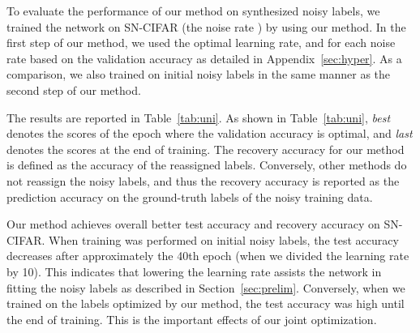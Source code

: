 \documentclass[10pt,twocolumn,letterpaper]{article}
\newcommand{\Tref}[1]{Table~\ref{#1}}
\newcommand{\Sref}[1]{Section~\ref{#1}}
\newcommand{\APref}[1]{Appendix~\ref{#1}}
\begin{document}
To evaluate the performance of our method on synthesized noisy labels, we trained the network on SN-CIFAR (the noise rate ) by using our method.
In the first step of our method, we used the optimal learning rate,  and  for each noise rate based on the validation accuracy as detailed in \APref{sec:hyper}.
As a comparison, we also trained on initial noisy labels in the same manner as the second step of our method.

The results are reported in \Tref{tab:uni}. As shown in \Tref{tab:uni}, \textit{best} denotes the scores of the epoch where the validation accuracy is optimal, and \textit{last} denotes the scores at the end of training.
The recovery accuracy for our method is defined as the accuracy of the reassigned labels.
Conversely, other methods do not reassign the noisy labels, and thus the recovery accuracy is reported as the prediction accuracy on the ground-truth labels of the noisy training data.

Our method achieves overall better test accuracy and recovery accuracy on SN-CIFAR.
When training was performed on initial noisy labels, the test accuracy decreases after approximately the 40th epoch (when we divided the learning rate by 10). This indicates that lowering the learning rate assists the network in fitting the noisy labels as described in \Sref{sec:prelim}. Conversely, when we trained on the labels optimized by our method, the test accuracy was high until the end of training. This is the important effects of our joint optimization.
\end{document}
